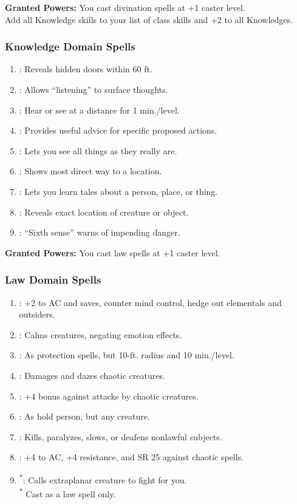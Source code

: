 \textbf{Granted Powers:} You cast divination spells at +1 caster level.
\\Add all Knowledge skills to your list of class skills and +2 to all Knowledges.
\subsubsection{Knowledge Domain Spells}
\begin{enumerate}
	\item{:} Reveals hidden doors within 60 ft.
	\item{:} Allows “listening” to surface thoughts.
	\item{:} Hear or see at a distance for 1 min./level.
	\item{:} Provides useful advice for specific proposed actions.
	\item{:} Lets you see all things as they really are.
	\item{:} Shows most direct way to a location.
	\item{:} Lets you learn tales about a person, place, or thing.
	\item{:} Reveals exact location of creature or object.
	\item{:} “Sixth sense” warns of impending danger.
\end{enumerate}

\textbf{Granted Powers:} You cast law spells at +1 caster level.
\subsubsection{Law Domain Spells}
\begin{enumerate}
	\item{:} +2 to AC and saves, counter mind control, hedge out elementals and outsiders.
	\item{:} Calms creatures, negating emotion effects.
	\item{:} As protection spells, but 10-ft. radius and 10 min./level.
	\item{:} Damages and dazes chaotic creatures.
	\item{:} +4 bonus against attacks by chaotic creatures.
	\item{:} As hold person, but any creature.
	\item{:} Kills, paralyzes, slows, or deafens nonlawful subjects.
	\item{:} +4 to AC, +4 resistance, and SR 25 against chaotic spells.
	\item{\textsuperscript{*}:} Calls extraplanar creature to fight for you.
	\\ \textsuperscript{*} Cast as a law spell only.
\end{enumerate}

